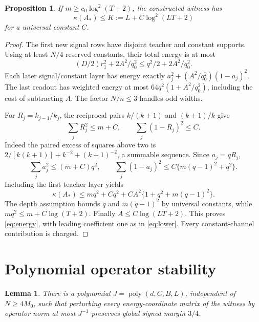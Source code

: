\documentclass[11pt]{article}
\newtheorem{lemma}[theorem]{Lemma}
\newtheorem{proposition}[theorem]{Proposition}
\theoremstyle{remark}\newtheorem{remark}[theorem]{Remark}
\newcommand{\poly}{\operatorname{poly}}
\begin{document}
\begin{proposition}\label{prop:energy}
If $m\ge c_0\log^2(T+2)$, the constructed witness has
\begin{equation}\label{eq:energy}
 \kappa(A_*)\le K:=L+C\log^2(LT+2)
\end{equation}
for a universal constant $C$.
\end{proposition}
\begin{proof}
The first new signal rows have disjoint teacher and constant supports.
Using at least $N/4$ reserved constants, their total energy is at most
\[
 (D/2)r_1^2+2A^2/q_0^2\le q^2/2+2A^2/q_0^2.
\]
Each later signal/constant layer has energy exactly
$a_j^2+(A^2/q_0^2)(1-a_j)^2$. The last readout has weighted energy
at most $64q^2(1+A^2/q_0^2)$, including the cost of subtracting $A$.
The factor $N/n\le3$ handles odd widths.

For $R_j=k_{j-1}/k_j$, the reciprocal pairs $k/(k+1)$ and $(k+1)/k$
give
\[
 \sum_jR_j^2\le m+C,\qquad \sum_j(1-R_j)^2\le C.
\]
Indeed the paired excess of squares above two is
$2/[k(k+1)]+k^{-2}+(k+1)^{-2}$, a summable sequence. Since $a_j=qR_j$,
\[
 \sum_j a_j^2\le(m+C)q^2,\qquad
 \sum_j(1-a_j)^2\le C\{m(q-1)^2+q^2\}.
\]
Including the first teacher layer yields
\[
 \kappa(A_*)\le mq^2+Cq^2+CA^2\{1+q^2+m(q-1)^2\}.
\]
The depth assumption bounds $q$ and $m(q-1)^2$ by universal constants,
while $mq^2\le m+C\log(T+2)$. Finally $A\le C\log(LT+2)$.
This proves \eqref{eq:energy}, with leading coefficient one as in
\eqref{eq:lower}. Every constant-channel contribution is charged.
\end{proof}

\section{Polynomial operator stability}

\begin{lemma}\label{lem:stability}
There is a polynomial $J=\poly(d,C,B,L)$, independent of $N\ge4M_0$,
such that perturbing every energy-coordinate matrix of the witness by
operator norm at most $J^{-1}$ preserves global signed margin $3/4$.
\end{lemma}
\end{document}
